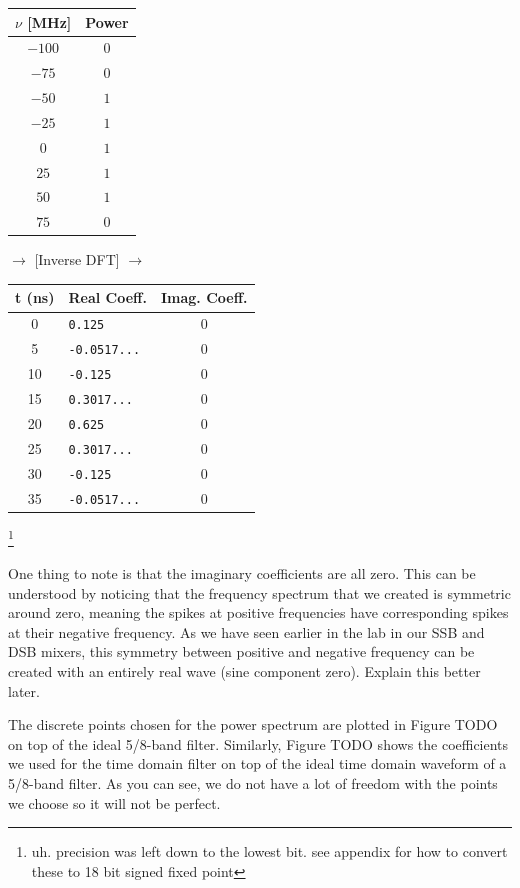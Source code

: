 \documentclass[12pt]{article}
\begin{document}
\begin{center}
  \begin{tabular}{ c | c }
    $\nu$ [MHz] & Power \\ \hline
    $-100$ & $0 $\\
    $-75$ & $0 $\\
    $-50$ & $1 $\\
    $-25$ & $1 $ \\
    $0$ & $1 $\\
    $25$ & $1 $  \\
    $50$ & $1$ \\
    $75$ & $0 $ \\
  \end{tabular}
  $\rightarrow$ [Inverse DFT] $\rightarrow$
  \begin{tabular}{c | l | c }
    t (ns)& Real Coeff. & Imag. Coeff.\\ \hline
    0 & \texttt{0.125} & $0$ \\
    5 & \texttt{-0.0517...}  & $0$ \\
    10 & \texttt{-0.125} & $0$ \\
    15 & \texttt{0.3017...} & $0$ \\
    20 & \texttt{0.625} & $0$ \\
    25 & \texttt{0.3017...} & $0$ \\
    30 & \texttt{-0.125} & $0$ \\
    35 & \texttt{-0.0517...} & $0$ \\
  \end{tabular}
\end{center}
\footnote{uh. precision was left down to the lowest bit. see appendix for how to convert these to 18 bit signed fixed point}

One thing to note is that the imaginary coefficients are all zero. This can be understood by noticing that the frequency spectrum that we created is symmetric around zero, meaning the spikes at positive frequencies have corresponding spikes at their negative frequency. As we have seen earlier in the lab in our SSB and DSB mixers, this symmetry between positive and negative frequency can be created with an entirely real wave (sine component zero). Explain this better later.

The discrete points chosen for the power spectrum are plotted in Figure TODO on top of the ideal 5/8-band filter. Similarly, Figure TODO shows the coefficients we used for the time domain filter on top of the ideal time domain waveform of a 5/8-band filter. As you can see, we do not have a lot of freedom with the points we choose so it will not be perfect.
 
\end{document}
